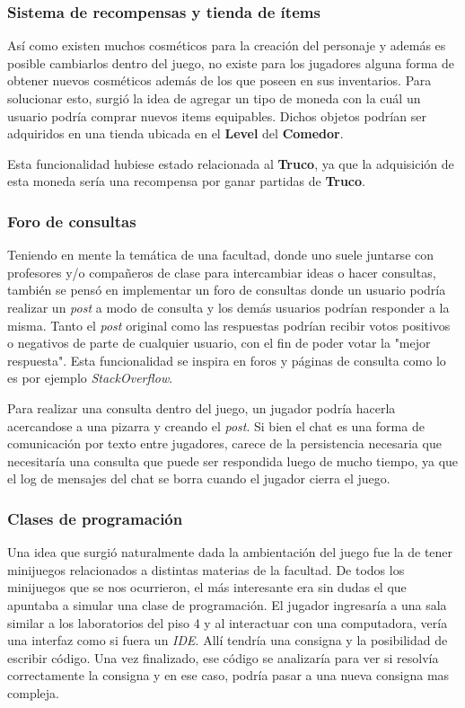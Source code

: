 \subsubsection{Sistema de recompensas y tienda de ítems}

\noindent Así como existen muchos cosméticos para la creación del personaje y además es posible cambiarlos dentro del
juego, no existe para los jugadores alguna forma de obtener nuevos cosméticos además de los que poseen en sus
inventarios. Para solucionar esto, surgió la idea de agregar un tipo de moneda con la cuál un usuario podría comprar nuevos
items equipables. Dichos objetos podrían ser adquiridos en una tienda ubicada en el \textbf{Level} del \textbf{Comedor}.

Esta funcionalidad hubiese estado relacionada al \textbf{Truco}, ya que la adquisición de esta moneda
sería una recompensa por ganar partidas de \textbf{Truco}.

\subsubsection{Foro de consultas}

\noindent Teniendo en mente la temática de una facultad, donde uno suele juntarse con profesores y/o compañeros de clase
para intercambiar ideas o hacer consultas, también se pensó en implementar un foro de consultas donde un usuario
podría realizar un \textit{post} a modo de consulta y los demás usuarios podrían responder a la misma. Tanto el \textit{post}
original como las respuestas podrían recibir votos positivos o negativos de parte de cualquier usuario, con el fin
de poder votar la "mejor respuesta". Esta funcionalidad se inspira en foros y páginas de consulta como lo es por ejemplo
\textit{StackOverflow}.

Para realizar una consulta dentro del juego, un jugador podría hacerla acercandose a una pizarra y creando el \textit{post}.
Si bien el chat es una forma de comunicación por texto entre jugadores, carece de la persistencia necesaria que necesitaría
una consulta que puede ser respondida luego de mucho tiempo, ya que el log de mensajes del chat se borra cuando el jugador
cierra el juego.

\subsubsection{Clases de programación}

\noindent Una idea que surgió naturalmente dada la ambientación del juego fue la de tener minijuegos relacionados a distintas materias
de la facultad. De todos los minijuegos que se nos ocurrieron, el más interesante era sin dudas el que apuntaba a simular
una clase de programación. El jugador ingresaría a una sala similar a los laboratorios del piso 4 y al interactuar con una
computadora, vería una interfaz como si fuera un \textit{IDE}. Allí tendría una consigna y la posibilidad de escribir código.
Una vez finalizado, ese código se analizaría para ver si resolvía correctamente la consigna y en ese caso, podría pasar a una nueva
consigna mas compleja.

